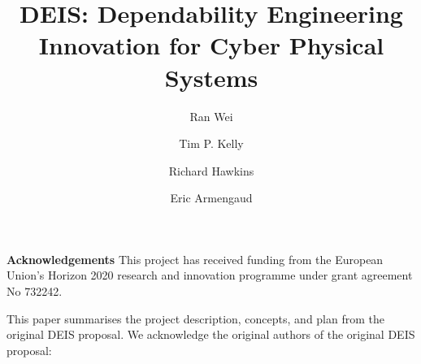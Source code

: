 \documentclass[runningheads,a4paper]{llncs}
\begin{document}
 
\title{\textbf{DEIS: Dependability Engineering Innovation for Cyber Physical Systems}}
\author{Ran Wei \and Tim P. Kelly \and Richard Hawkins 
\and Eric Armengaud 
}
\maketitle

















\noindent\textbf{Acknowledgements}
This project has received funding from the European Union’s Horizon 2020 research and innovation programme under grant agreement No 732242. 

This paper summarises the project description, concepts, and plan from the original DEIS proposal. We acknowledge the original authors of the original DEIS proposal: 

\end{document}
